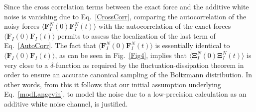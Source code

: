 \documentclass[format=acmsmall,urlbreakonhyphens]{acmart}
\begin{document}
Since the cross correlation terms between the exact force and the additive white noise is vanishing due to Eq.~\ref{CrossCorr}, comparing the autocorrelation of the noisy forces $\langle \textbf{F}_{I}^{N}(0)\textbf{F}_{I}^{N}(t)\rangle$ with the autocorrelation of the exact forces $\langle \textbf{F}_{I}(0) \textbf{F}_{I}(t)\rangle$ permits to assess the localization of the last term of Eq.~\ref{AutoCorr}.
The fact that $\langle \textbf{F}_{I}^{N}(0)\textbf{F}_{I}^{N}(t)\rangle$ is essentially identical to $\langle \textbf{F}_{I}(0) \textbf{F}_{I}(t)\rangle$, as can be seen in Fig.~\ref{Fig4}, implies that $\langle \mathbf{\Xi } _{I}^{N}(0) \mathbf{\Xi } _{I}^{N}(t)\rangle$ is very close to a $\delta$-function as required by the fluctuation-dissipation theorem in order to ensure an accurate canonical sampling of the Boltzmann distribution. In other words, from this it follows that our initial assumption underlying Eq.~\ref{modLangevin}, to model the noise due to a low-precision calculation as an additive white noise channel, is justified.
\end{document}
